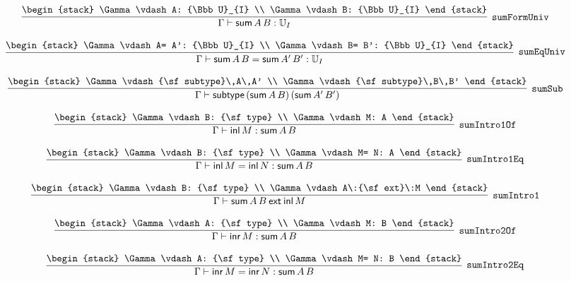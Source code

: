 \[
\infer[{\tt sumFormUniv}]{\Gamma \vdash {\sf sum}\,A\,B: {\Bbb U}_{I}}{
\begin{stack}
\Gamma \vdash A: {\Bbb U}_{I}
\\
\Gamma \vdash B: {\Bbb U}_{I}
\end{stack}}
\]

\[
\infer[{\tt sumEqUniv}]{\Gamma \vdash {\sf sum}\,A\,B= {\sf sum}\,A'\,B': {\Bbb U}_{I}}{
\begin{stack}
\Gamma \vdash A= A': {\Bbb U}_{I}
\\
\Gamma \vdash B= B': {\Bbb U}_{I}
\end{stack}}
\]

\[
\infer[{\tt sumSub}]{\Gamma \vdash {\sf subtype}\,({\sf sum}\,A\,B)\,({\sf sum}\,A'\,B')}{
\begin{stack}
\Gamma \vdash {\sf subtype}\,A\,A'
\\
\Gamma \vdash {\sf subtype}\,B\,B'
\end{stack}}
\]

\[
\infer[{\tt sumIntro1Of}]{\Gamma \vdash {\sf inl}\,M: {\sf sum}\,A\,B}{
\begin{stack}
\Gamma \vdash B: {\sf type}
\\
\Gamma \vdash M: A
\end{stack}}
\]

\[
\infer[{\tt sumIntro1Eq}]{\Gamma \vdash {\sf inl}\,M= {\sf inl}\,N: {\sf sum}\,A\,B}{
\begin{stack}
\Gamma \vdash B: {\sf type}
\\
\Gamma \vdash M= N: A
\end{stack}}
\]

\[
\infer[{\tt sumIntro1}]{\Gamma \vdash {\sf sum}\,A\,B\:{\sf ext}\:{\sf inl}\,M}{
\begin{stack}
\Gamma \vdash B: {\sf type}
\\
\Gamma \vdash A\:{\sf ext}\:M
\end{stack}}
\]

\[
\infer[{\tt sumIntro2Of}]{\Gamma \vdash {\sf inr}\,M: {\sf sum}\,A\,B}{
\begin{stack}
\Gamma \vdash A: {\sf type}
\\
\Gamma \vdash M: B
\end{stack}}
\]

\[
\infer[{\tt sumIntro2Eq}]{\Gamma \vdash {\sf inr}\,M= {\sf inr}\,N: {\sf sum}\,A\,B}{
\begin{stack}
\Gamma \vdash A: {\sf type}
\\
\Gamma \vdash M= N: B
\end{stack}}
\]

